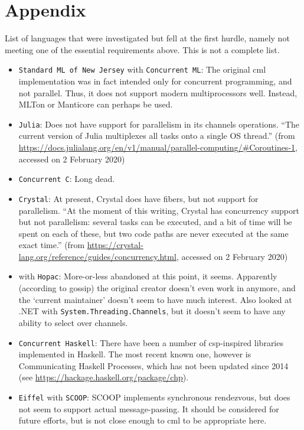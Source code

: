 \section{Appendix}
List of languages that were investigated but fell at the first hurdle, namely not meeting one of the essential requirements above.  This is not a complete list.

\begin{itemize}
    \item \texttt{Standard ML of New Jersey} with \texttt{Concurrent ML}:  The original \gls{cml} implementation was in fact intended only for concurrent programming, and not parallel.  Thus, it does not support modern multiprocessors well.  Instead, MLTon or Manticore can perhaps be used.
    \item \texttt{Julia}:  Does not have support for parallelism in its channels operations.  ``The current version of Julia multiplexes all tasks onto a single OS thread.'' (from \url{https://docs.julialang.org/en/v1/manual/parallel-computing/#Coroutines-1}, accessed on 2 February 2020)
    \item \texttt{Concurrent C}:  Long dead.
    \item \texttt{Crystal}:  At present, Crystal does have fibers, but not support for parallelism.  ``At the moment of this writing, Crystal has concurrency support but not parallelism: several tasks can be executed, and a bit of time will be spent on each of these, but two code paths are never executed at the same exact time.'' (from \url{https://crystal-lang.org/reference/guides/concurrency.html}, accessed on 2 February 2020)
    \item \texttt{\fsharp{}} with \texttt{Hopac}:  More-or-less abandoned at this point, it seems.  Apparently (according to gossip) the original creator doesn't even work in \fsharp{} anymore, and the `current maintainer' doesn't seem to have much interest.  Also looked at .NET with \texttt{System.Threading.Channels}, but it doesn't seem to have any ability to select over channels.
    \item \texttt{Concurrent Haskell}:  There have been a number of \gls{csp}-inspired libraries implemented in Haskell.  The most recent known one, however is Communicating Haskell Processes, which has not been updated since 2014 (see \url{https://hackage.haskell.org/package/chp}).
    \item \texttt{Eiffel} with \texttt{SCOOP}:  SCOOP implements synchronous rendezvous, but does not seem to support actual message-passing.  It should be considered for future efforts, but is not close enough to \gls{cml} to be appropriate here.

\end{itemize}
